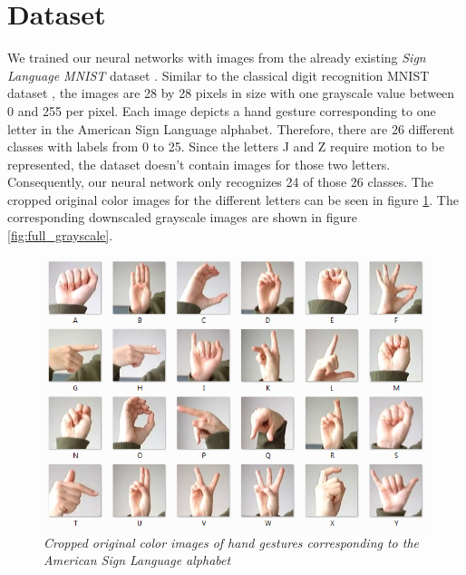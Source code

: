 \documentclass[a4paper]{article}
\begin{document}
\section{Dataset}
\label{ch:dataset}

We trained our neural networks with images from the already existing \textit{Sign Language MNIST} dataset \cite{DatasetKaggle}. Similar to the classical digit recognition MNIST dataset \cite{MNIST}, the images are 28 by 28 pixels in size with one grayscale value between 0 and 255 per pixel. Each image depicts a hand gesture corresponding to one letter in the American Sign Language alphabet. Therefore, there are 26 different classes with labels from 0 to 25. Since the letters J and Z require motion to be represented, the dataset doesn't contain images for those two letters. Consequently, our neural network only recognizes 24 of those 26 classes. The cropped original color images for the different letters can be seen in figure \ref{fig:full_colored}. The corresponding downscaled grayscale images are shown in figure \ref{fig:full_grayscale}.

\begin{figure}
     \centering
     \includegraphics[width=1\linewidth]{graphics/dataset/amer_sign2.png}
     \caption{\textit{Cropped original color images of hand gestures corresponding to the American Sign Language alphabet \cite{DatasetKaggle}}}
     \label{fig:full_colored}
\end{figure}
\end{document}

